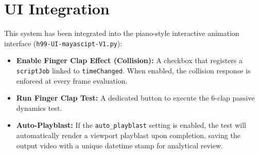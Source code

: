 \documentclass{article}
\begin{document}
\section{UI Integration}
This system has been integrated into the piano-style interactive animation interface (\texttt{h99-UI-mayascipt-V1.py}):
\begin{itemize}
    \item \textbf{Enable Finger Clap Effect (Collision):} A checkbox that registers a \texttt{scriptJob} linked to \texttt{timeChanged}. When enabled, the collision response is enforced at every frame evaluation.
    \item \textbf{Run Finger Clap Test:} A dedicated button to execute the 6-clap passive dynamics test.
    \item \textbf{Auto-Playblast:} If the \texttt{auto\_playblast} setting is enabled, the test will automatically render a viewport playblast upon completion, saving the output video with a unique datetime stamp for analytical review.
\end{itemize}
\end{document}
